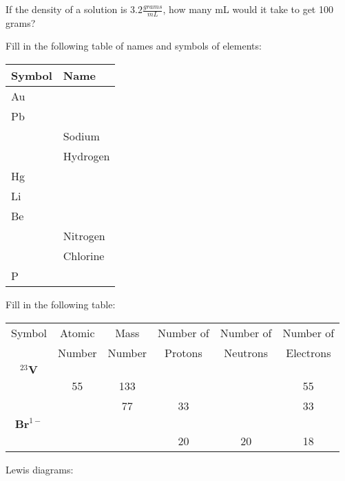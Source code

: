 \documentclass[addpoints, 12pt]{exam}
\begin{document}
\begin{questions}
\question[5]
If the density of a solution is $3.2 \frac{grams}{mL}$, how many mL would it take to get 100 grams?

\question[10]
Fill in the following table of names and symbols of elements:

\begin{tabular}{| l | l |}
\hline
Symbol & Name \\
\hline
Au & \\
Pb & \\
 & Sodium\\
 & Hydrogen\\
Hg & \\
Li & \\
Be & \\
 & Nitrogen \\
 & Chlorine \\
P & \\
\hline
\end{tabular}

\question[10]
Fill in the following table:

\begin{tabular}{| c | c | c | c | c | c |}
\hline
Symbol & Atomic & Mass & Number of&Number of&Number of \\
 & Number & Number & Protons & Neutrons & Electrons \\
\hline
$^{23}\textbf{V}$ & & & & & \\
\hline
 & 55 & 133 & & & 55\\
\hline
& & 77 & 33 & & 33\\ 
\hline
$\textbf{Br}^{1-}$ & & & & & \\
\hline
& & & 20 & 20 & 18 \\ 
\hline
\end{tabular}

\question[10]
Lewis diagrams:

\end{questions}
\end{document}
